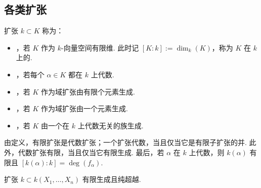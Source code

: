 \subsection{各类扩张}\label{sec:galois-2-1-4}
\begin{definition*}
扩张 $k\subset K$ 称为：
\begin{itemize}
\item {}，若 $K$ 作为 $k$-向量空间有限维. 此时记 $[K:k]:=\dim_k(K)$，称为 $K$ 在 $k$ 上的.
\item {}，若每个 $\alpha\in K$ 都在 $k$ 上代数.
\item {}，若 $K$ 作为域扩张由有限个元素生成.
\item {}，若 $K$ 作为域扩张由一个元素生成.
\item {}，若 $K$ 由一个在 $k$ 上代数无关的族生成.
\end{itemize}
\end{definition*}
\begin{remark*}
由定义，有限扩张是代数扩张；一个扩张代数，当且仅当它是有限子扩张的并. 此外，代数扩张有限，当且仅当它有限生成. 最后，若 $\alpha$ 在 $k$ 上代数，则 $k(\alpha)$ 有限且 $[k(\alpha):k]=\deg(f_\alpha)$.
\end{remark*}
\begin{example*}
扩张 $k\subset k(X_1,\ldots,X_n)$ 有限生成且纯超越.
\end{example*}
